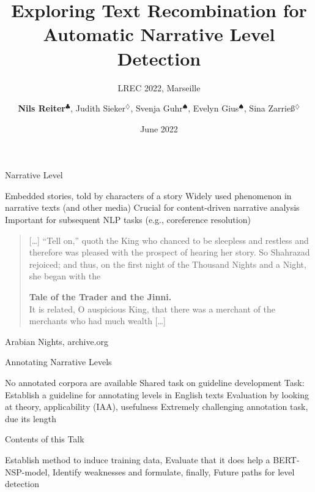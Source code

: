\documentclass[aspectratio=169]{beamer}
\title[Narrative Level Detection]{Exploring Text Recombination for Automatic Narrative Level Detection}
\subtitle{LREC 2022, Marseille}
\author[]{\textbf{Nils Reiter}$^\clubsuit$, Judith Sieker$^\diamondsuit$, Svenja Guhr$^\spadesuit$, Evelyn Gius$^\spadesuit$, Sina Zarrieß$^\diamondsuit$}
\institute{Universities of Cologne$^\clubsuit$, Bielefeld$^\diamondsuit$, Darmstadt$^\spadesuit$}
\date[]{June 2022}
\begin{document}
\maketitleframe

\begin{frame}{Narrative Level}
\begin{outline}
\1 Embedded stories, told by characters of a story
\1 Widely used phenomenon in narrative texts (and other media)
\1 Crucial for content-driven narrative analysis
\1 Important for subsequent NLP tasks (e.g., coreference resolution)
\end{outline}
\pause
\begin{example}
\begin{quote}
[\dots] \enquote{Tell on,} quoth the King who chanced to be sleepless and restless and therefore was pleased with the prospect of hearing her story. So Shahrazad rejoiced; and thus, on the first night of the Thousand Nights and a Night, she began with the

\noindent\textbf{Tale of the Trader and the Jinni.} \faArrowCircleDown\\
\noindent It is related, O auspicious King, that there was a merchant of the merchants who had much wealth [\dots]
\end{quote}\hfill Arabian Nights, archive.org

\end{example}
\end{frame}

\begin{frame}{Annotating Narrative Levels}
\begin{outline}
\1 No annotated corpora are available
\1 Shared task on guideline development 
\2 Task: Establish a guideline for annotating levels in English texts
\2 Evaluation by looking at theory, applicability (IAA), usefulness
\2 Extremely challenging annotation task, due its length
\end{outline}

\pause

\begin{block}{Contents of this Talk}
\begin{outline}
\1 Establish method to induce training data,
\1 Evaluate that it does help a BERT-NSP-model,
\1 Identify weaknesses and formulate, finally,
\1 Future paths for level detection
\end{outline}
\end{block}
\end{frame}
\end{document}
